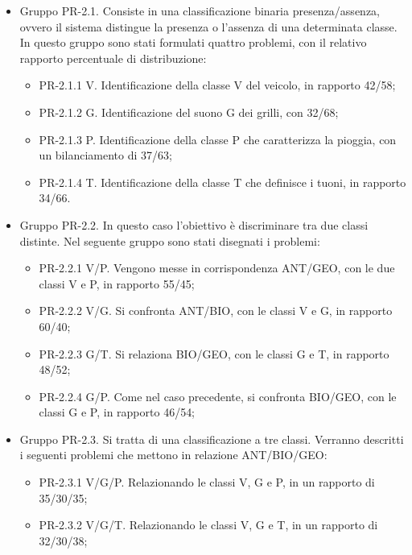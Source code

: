 \begin{itemize}
	\item{Gruppo PR-2.1. Consiste in una classificazione binaria presenza/assenza, ovvero il
		sistema distingue la presenza o l’assenza di una determinata classe. In questo gruppo
		sono stati formulati quattro problemi, con il relativo rapporto percentuale di
		distribuzione:}
		\begin{itemize}	
			\item{PR-2.1.1 V. Identificazione della classe V del veicolo, in rapporto 42/58;}
			\item{PR-2.1.2 G. Identificazione del suono G dei grilli, con 32/68;}
			\item{PR-2.1.3 P. Identificazione della classe P che caratterizza la pioggia, con un bilanciamento di 37/63;}
			\item{PR-2.1.4 T. Identificazione della classe T che definisce i tuoni, in rapporto 34/66.}
		\end{itemize}
	\item{Gruppo PR-2.2. In questo caso l’obiettivo è discriminare tra due classi distinte. Nel seguente gruppo sono stati disegnati i problemi:}
		\begin{itemize}
			\item{PR-2.2.1 V/P. Vengono messe in corrispondenza ANT/GEO, con le due classi V e P, in rapporto 55/45;}
			\item{PR-2.2.2 V/G. Si confronta ANT/BIO, con le classi V e G, in rapporto 60/40;}
			\item{PR-2.2.3 G/T. Si relaziona BIO/GEO, con le classi G e T, in rapporto 48/52;}
			\item{PR-2.2.4 G/P. Come nel caso precedente, si confronta BIO/GEO, con le classi G e P, in rapporto 46/54;}
		\end{itemize}
	\item{Gruppo PR-2.3. Si tratta di una classificazione a tre classi. Verranno descritti i seguenti problemi che mettono in relazione ANT/BIO/GEO:}
		\begin{itemize}
			\item{PR-2.3.1 V/G/P. Relazionando le classi V, G e P, in un rapporto di 35/30/35;}
			\item{PR-2.3.2 V/G/T. Relazionando le classi V, G e T, in un rapporto di 32/30/38;}
		\end{itemize}
\end{itemize}

